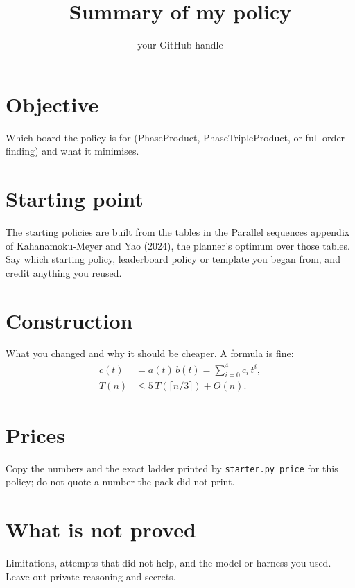 \documentclass[11pt]{article}
\title{Summary of my policy}
\author{your GitHub handle}
\date{}
\begin{document}
\maketitle

\section*{Objective}
Which board the policy is for (PhaseProduct, PhaseTripleProduct, or full order finding) and what it minimises.

\section*{Starting point}
The starting policies are built from the tables in the Parallel sequences appendix of Kahanamoku-Meyer and Yao (2024), the planner's optimum over those tables.
Say which starting policy, leaderboard policy or template you began from, and credit anything you reused.

\section*{Construction}
What you changed and why it should be cheaper. A formula is fine:
\begin{align}
  c(t) &= a(t)\,b(t) = \sum_{i=0}^{4} c_i\, t^i, \\
  T(n) &\le 5\,T(\lceil n/3 \rceil) + O(n).
\end{align}

\section*{Prices}
Copy the numbers and the exact ladder printed by \texttt{starter.py price} for this policy; do not quote a number the pack did not print.

\section*{What is not proved}
Limitations, attempts that did not help, and the model or harness you used. Leave out private reasoning and secrets.
\end{document}
